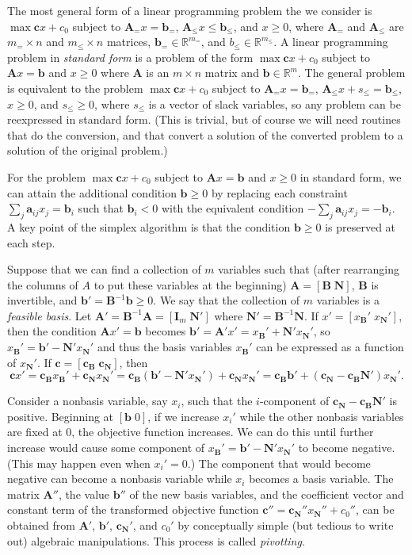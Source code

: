 \documentclass[12pt]{article}
\theoremstyle{definition}
\renewcommand{\Re}{\mathbb{R}}
\newcommand{\ba}{\mathbf{a}}
\newcommand{\bb}{\mathbf{b}}
\newcommand{\bc}{\mathbf{c}}
\newcommand{\bA}{\mathbf{A}}
\newcommand{\bB}{\mathbf{B}}
\newcommand{\bI}{\mathbf{I}}
\newcommand{\bN}{\mathbf{N}}
\begin{document}
\begin{appendix}
The most general form of a linear programming problem the we consider
is $\max \bc x + c_0$ subject to $\bA_= x = \bb_=$, $\bA_\le x \le
\bb_\le$, and $x \ge 0$, where $\bA_=$ and $\bA_\le$ are $m_= \times
n$ and $m_\le \times n$ matrices, $\bb_= \in \Re^{m_=}$, and $b_\le
\in \Re^{m_\le}$.  A linear programming problem in \emph{standard
form} is a problem of the form $\max \bc x + c_0$ subject to $\bA x =
\bb$ and $x \ge 0$ where $\bA$ is an $m \times n$ matrix and $\bb \in
\Re^m$.  The general problem is equivalent to the problem $\max \bc x
+ c_0$ subject to $\bA_= x = \bb_=$, $\bA_\le x + s_\le = \bb_\le$, $x
\ge 0$, and $s_\le \ge 0$, where $s_\le$ is a vector of slack
variables, so any problem can be reexpressed in standard form.  (This
is trivial, but of course we will need routines that do the
conversion, and that convert a solution of the converted problem to a
solution of the original problem.)

For the problem $\max \bc x + c_0$ subject to $\bA x = \bb$ and $x \ge
0$ in standard form, we can attain the additional condition $\bb \ge
0$ by replacing each constraint $\sum_j \ba_{ij} x_j = \bb_i$ such
that $\bb_i < 0$ with the equivalent condition $-\sum_j \ba_{ij} x_j =
-\bb_i$.  A key point of the simplex algorithm is that the condition
$\bb \ge 0$ is preserved at each step.

Suppose that we can find a collection of $m$ variables such that
(after rearranging the columns of $A$ to put these variables at the
beginning) $\bA = [\bB \; \bN]$, $\bB$ is invertible, and $\bb' =
\bB^{-1} \bb \ge 0$.  We say that the collection of $m$ variables is a
\emph{feasible basis}.  Let $\bA' = \bB^{-1}\bA = [\bI_m \; \bN']$ where
$\bN' = \bB^{-1}\bN$.  If $x' = [x_\bB' \; x_\bN']$, then the
condition $\bA x' = \bb$ becomes $\bb' = \bA' x' = x_\bB' + \bN'
x_\bN'$, so $x_\bB' = \bb' - \bN' x_\bN'$ and thus the basis variables
$x_\bB'$ can be expressed as a function of $x_\bN'$.  If $\bc =
[\bc_\bB \; \bc_\bN]$, then $$\bc x' = \bc_\bB x_\bB' + \bc_\bN x_\bN'
= \bc_\bB (\bb' - \bN' x_\bN') + \bc_\bN x_\bN' = \bc_\bB \bb' +
(\bc_\bN - \bc_\bB \bN')x_\bN'.$$

Consider a nonbasis variable, say $x_i$, such that the $i$-component
of $\bc_\bN - \bc_\bB \bN'$ is positive.  Beginning at $[\bb \; 0]$,
if we increase $x_i'$ while the other nonbasis variables are fixed at
$0$, the objective function increases.  We can do this until further
increase would cause some component of $x_\bB' = \bb' - \bN' x_\bN'$
to become negative.  (This may happen even when $x_i' = 0$.)  The
component that would become negative can become a nonbasis variable
while $x_i$ becomes a basis variable.  The matrix $\bA''$, the value
$\bb''$ of the new basis variables, and the coefficient vector and
constant term of the transformed objective function $\bc'' = \bc_\bN''
x_\bN'' + c_0''$, can be obtained from $\bA'$, $\bb'$, $\bc_\bN'$, and
$c_0'$ by conceptually simple (but tedious to write out) algebraic
manipulations.  This process is called \emph{pivotting}.


\end{appendix}
\end{document}
